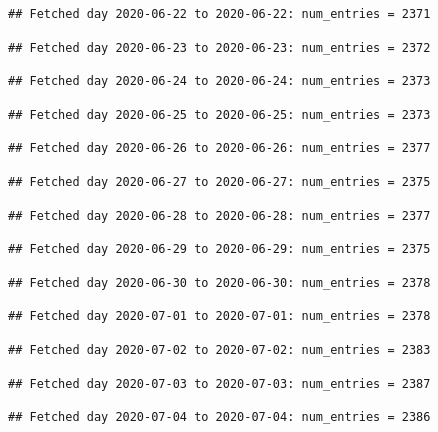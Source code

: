 \documentclass[]{article}
\begin{document}
\begin{verbatim}
## Fetched day 2020-06-22 to 2020-06-22: num_entries = 2371
\end{verbatim}

\begin{verbatim}
## Fetched day 2020-06-23 to 2020-06-23: num_entries = 2372
\end{verbatim}

\begin{verbatim}
## Fetched day 2020-06-24 to 2020-06-24: num_entries = 2373
\end{verbatim}

\begin{verbatim}
## Fetched day 2020-06-25 to 2020-06-25: num_entries = 2373
\end{verbatim}

\begin{verbatim}
## Fetched day 2020-06-26 to 2020-06-26: num_entries = 2377
\end{verbatim}

\begin{verbatim}
## Fetched day 2020-06-27 to 2020-06-27: num_entries = 2375
\end{verbatim}

\begin{verbatim}
## Fetched day 2020-06-28 to 2020-06-28: num_entries = 2377
\end{verbatim}

\begin{verbatim}
## Fetched day 2020-06-29 to 2020-06-29: num_entries = 2375
\end{verbatim}

\begin{verbatim}
## Fetched day 2020-06-30 to 2020-06-30: num_entries = 2378
\end{verbatim}

\begin{verbatim}
## Fetched day 2020-07-01 to 2020-07-01: num_entries = 2378
\end{verbatim}

\begin{verbatim}
## Fetched day 2020-07-02 to 2020-07-02: num_entries = 2383
\end{verbatim}

\begin{verbatim}
## Fetched day 2020-07-03 to 2020-07-03: num_entries = 2387
\end{verbatim}

\begin{verbatim}
## Fetched day 2020-07-04 to 2020-07-04: num_entries = 2386
\end{verbatim}
\end{document}
